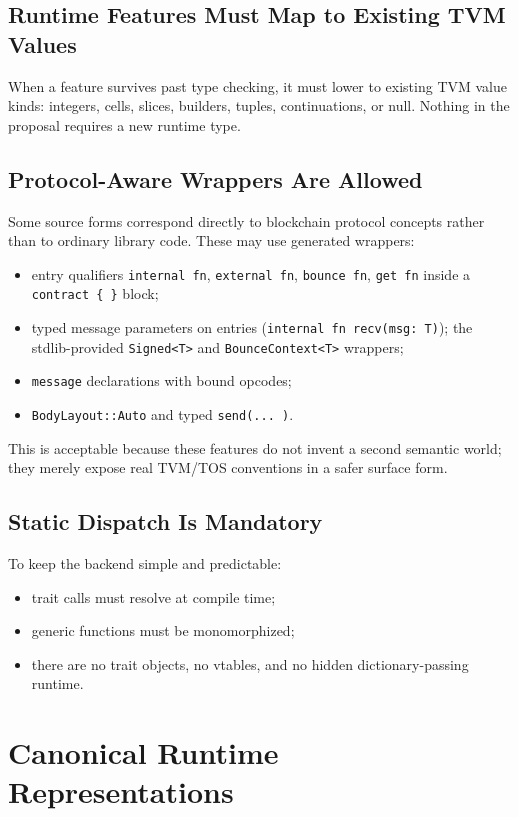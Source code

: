 \documentclass[12pt,oneside]{article}
\begin{document}
\subsection{Runtime Features Must Map to Existing TVM Values}
When a feature survives past type checking, it must lower to existing TVM value
kinds: integers, cells, slices, builders, tuples, continuations, or null.
Nothing in the proposal requires a new runtime type.

\subsection{Protocol-Aware Wrappers Are Allowed}
Some source forms correspond directly to blockchain protocol concepts rather
than to ordinary library code. These may use generated wrappers:

\begin{itemize}
\item entry qualifiers \verb|internal fn|, \verb|external fn|,
\verb|bounce fn|, \verb|get fn| inside a \verb|contract { }| block;
\item typed message parameters on entries
(\verb|internal fn recv(msg: T)|); the stdlib-provided
\verb|Signed<T>| and \verb|BounceContext<T>| wrappers;
\item \verb|message| declarations with bound opcodes;
\item \verb|BodyLayout::Auto| and typed \verb|send(... )|.
\end{itemize}

This is acceptable because these features do not invent a second semantic
world; they merely expose real TVM/TOS conventions in a safer surface form.

\subsection{Static Dispatch Is Mandatory}
To keep the backend simple and predictable:

\begin{itemize}
\item trait calls must resolve at compile time;
\item generic functions must be monomorphized;
\item there are no trait objects, no vtables, and no hidden dictionary-passing
runtime.
\end{itemize}

\section{Canonical Runtime Representations}
\end{document}
